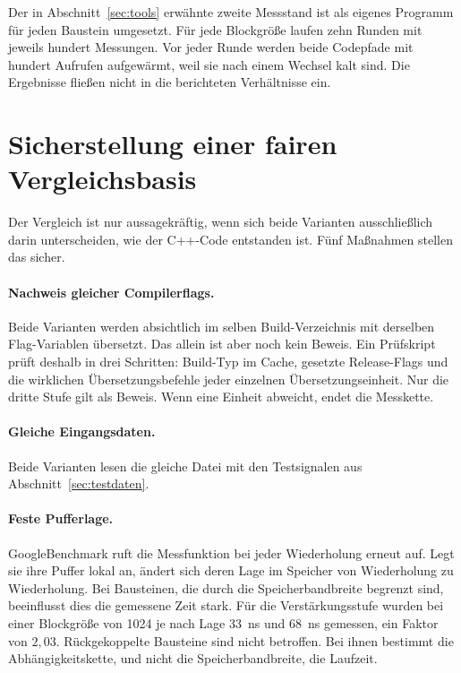 Der in Abschnitt~\ref{sec:tools} erwähnte zweite Messstand ist als eigenes Programm für jeden Baustein umgesetzt. Für jede Blockgröße laufen zehn Runden mit jeweils hundert Messungen. Vor jeder Runde werden beide Codepfade mit hundert Aufrufen aufgewärmt, weil sie nach einem Wechsel kalt sind. Die Ergebnisse fließen nicht in die berichteten Verhältnisse ein.

\section{Sicherstellung einer fairen Vergleichsbasis}
\label{sec:fair}

Der Vergleich ist nur aussagekräftig, wenn sich beide Varianten ausschließlich darin unterscheiden, wie der C++-Code entstanden ist. Fünf Maßnahmen stellen das sicher.

\paragraph{Nachweis gleicher Compilerflags.}
Beide Varianten werden absichtlich im selben Build-Verzeichnis mit derselben Flag-Variablen übersetzt. Das allein ist aber noch kein Beweis. Ein Prüfskript prüft deshalb in drei Schritten: Build-Typ im Cache, gesetzte Release-Flags und die wirklichen Übersetzungsbefehle jeder einzelnen Übersetzungseinheit. Nur die dritte Stufe gilt als Beweis. Wenn eine Einheit abweicht, endet die Messkette.

\paragraph{Gleiche Eingangsdaten.}
Beide Varianten lesen die gleiche Datei mit den Testsignalen aus Abschnitt~\ref{sec:testdaten}.

\paragraph{Feste Pufferlage.}
GoogleBenchmark ruft die Messfunktion bei jeder Wiederholung erneut auf. Legt sie ihre Puffer lokal an, ändert sich deren Lage im Speicher von Wiederholung zu Wiederholung. Bei Bausteinen, die durch die Speicherbandbreite begrenzt sind, beeinflusst dies die gemessene Zeit stark. Für die Verstärkungsstufe wurden bei einer Blockgröße von 1024 je nach Lage $33$~ns und $68$~ns gemessen, ein Faktor von $2{,}03$. Rückgekoppelte Bausteine sind nicht betroffen. Bei ihnen bestimmt die Abhängigkeitskette, und nicht die Speicherbandbreite, die Laufzeit.

